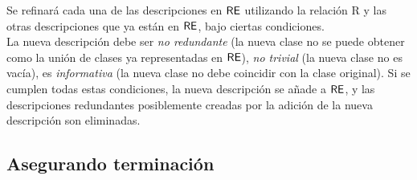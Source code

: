 Se refinar\'a cada una de las descripciones
en $\textsf{RE}$ utilizando la relaci\'on R y las otras descripciones que ya est\'an en
$\textsf{RE}$, bajo ciertas condiciones. \\

La nueva descripci\'on debe ser
\emph{no redundante} (la nueva clase no se puede obtener como la uni\'on de
clases ya representadas en $\textsf{RE}$), \emph{no trivial} (la nueva
clase no es vac\'{i}a), es \emph{informativa} (la nueva clase no debe
coincidir con la clase original). Si se cumplen todas estas condiciones,
la nueva descripci\'on se a\~nade a $\textsf{RE}$, y las descripciones redundantes
posiblemente creadas por la adici\'on de la nueva descripci\'on son
eliminadas.\\

%


\subsection{Asegurando terminaci\'on}

